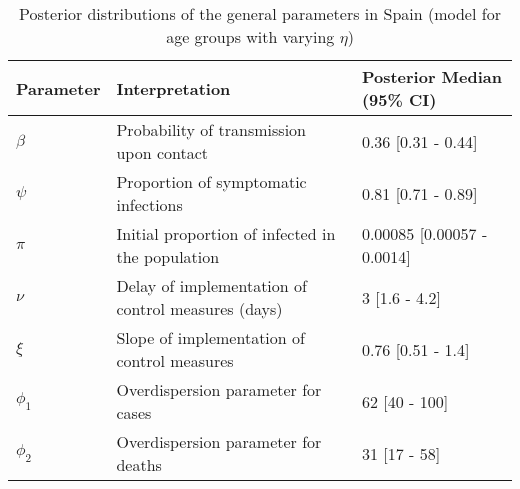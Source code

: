 \begin{table}[ht]
\centering
\begin{tabular}{lp{9cm}p{3cm}}
  \hline
Parameter & Interpretation & Posterior Median (95\% CI) \\ 
  \hline
$\beta$ & Probability of transmission upon contact & 0.36 [0.31 - 0.44] \\ 
  $\psi$ & Proportion of symptomatic infections & 0.81 [0.71 - 0.89] \\ 
  $\pi$ & Initial proportion of infected in the population & 0.00085 [0.00057 - 0.0014] \\ 
  $\nu$ & Delay of implementation of control measures (days) & 3 [1.6 - 4.2] \\ 
  $\xi$ & Slope of implementation of control measures & 0.76 [0.51 - 1.4] \\ 
  $\phi_1$ & Overdispersion parameter for cases & 62 [40 - 100] \\ 
  $\phi_2$ & Overdispersion parameter for deaths & 31 [17 - 58] \\ 
   \hline
\end{tabular}
\caption{Posterior distributions of the general parameters in Spain (model for age groups with varying $\eta$)} 
\label{tab:ParamTableSpain_Age_VaryingEta}
\end{table}
